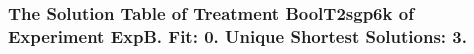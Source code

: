  \begin{frame}
 \fontsize{8pt}{9pt}\selectfont
 \frametitle{ The Solution Table of Treatment BoolT2sgp6k of Experiment ExpB. Fit: 0. Unique Shortest Solutions: 3. }

 \label{ExpBSolutionTable014.tex}  
 \end{frame}

